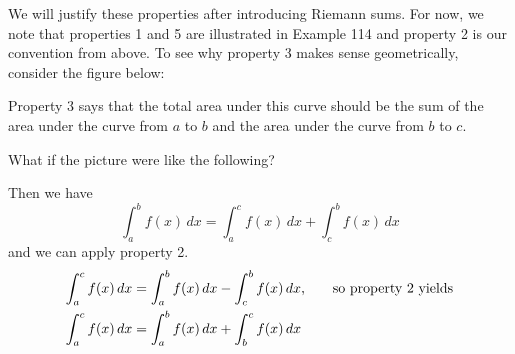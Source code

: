 \documentclass[11pt]{report}
\begin{document}
\begin{enumerate}
{We will justify these properties after introducing Riemann sums. For now, we note that properties 1 and 5 are illustrated in Example 114 and property 2 is our convention from above. To see why property 3 makes sense geometrically, consider the figure below:


%

Property 3 says that the total area under this curve should be the sum of the area under the curve from $a$ to $b$ and the area under the curve from $b$ to $c$.

What if the picture were like the following?


%

Then we have \[ \int_a^b f(x)\,dx =\int_a^c f(x)\,dx+\int_c^b f(x)\,dx\] and we can apply property 2.
\begin{equation*}
\begin{split}
\int_a^c f(x)\,dx &=\int_a^b f(x)\,dx-\int_c^b f(x)\,dx  \text{,\qquad so property 2 yields}\\
\int_a^c f(x)\,dx &=\int_a^b f(x)\,dx+\int_b^c f(x)\,dx 
\end{split}
\end{equation*}

}
\end{enumerate}
\end{document}
